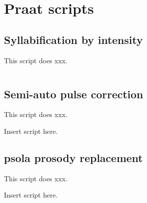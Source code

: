 \chapter{Praat scripts\label{apx:PraatScripts}}

\section{Syllabification by intensity}
This script does xxx.

	\inputminted[fontsize=\small, tabsize=2]{r}{../scripts/syllByIntens_dissVersion.praat}

\section{Semi-auto pulse correction}
This script does xxx.

Insert script here.

\section{\ac{psola} prosody replacement}
This script does xxx.

Insert script here.
